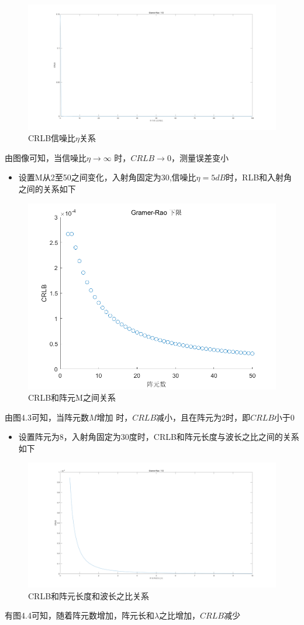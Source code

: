 \documentclass[fontset=windows]{article}
\numberwithin{figure}{section}
\begin{document}
\begin{figure}[H]
	\centering
	\includegraphics[width=0.75\linewidth]{CRLB 信噪比eta.png}
	\caption{CRLB信噪比$\eta$关系}
\end{figure}
由图像可知，当信噪比$\eta \to \infty$ 时，$CRLB \to 0$，测量误差变小
\begin{itemize}
	\item 设置M从2至50之间变化，入射角固定为30,信噪比$\eta =5dB$时，RLB和入射角之间的关系如下
\end{itemize}
\begin{figure}
	\centering
	\includegraphics[width=0.75\linewidth]{CRLB 阵元数.png}
	\caption{CRLB和阵元M之间关系}


\end{figure}
由图4.3可知，当阵元数$M$增加 时，$CRLB$减小，且在阵元为2时，即$CRLB$小于0
\begin{itemize}
	\item 设置阵元为8，入射角固定为30度时，CRLB和阵元长度与波长之比之间的关系如下
\end{itemize}
\begin{figure}[H]
	\centering
	\includegraphics[width=0.75\linewidth]{CRLB 波长比.png}
	\caption{CRLB和阵元长度和波长之比关系}
\end{figure}
有图4.4可知，随着阵元数增加，阵元长和$\lambda$之比增加，$CRLB减少$
\end{document}

